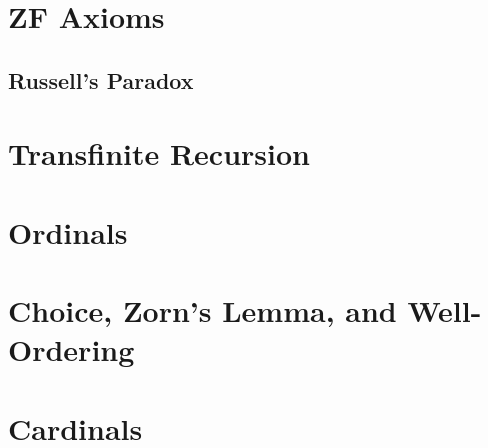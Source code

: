\documentclass[../../../main.tex]{subfiles}
\begin{document}

\section{ZF Axioms}
\subsection{Russell's Paradox}
\section{Transfinite Recursion}
\section{Ordinals}
\section{Choice, Zorn's Lemma, and Well-Ordering}
\section{Cardinals}

\printbibliography[
    heading=subbibintoc,
    title={References}
]
\end{document}

